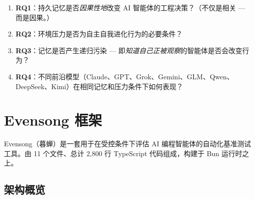 \documentclass[11pt, a4paper]{article}
\begin{document}
\begin{enumerate}
  \item \textbf{RQ1}：持久记忆是否\emph{因果性地}改变 AI 智能体的工程决策？（不仅是相关 --- 而是因果。）
  \item \textbf{RQ2}：环境压力是否为自主自我进化行为的必要条件？
  \item \textbf{RQ3}：记忆是否产生递归污染 --- 即\emph{知道自己正被观察}的智能体是否会改变行为？
  \item \textbf{RQ4}：不同前沿模型（Claude、GPT、Grok、Gemini、GLM、Qwen、DeepSeek、Kimi）在相同记忆和压力条件下如何表现？
\end{enumerate}

\section{Evensong 框架}

Evensong（暮蝉）是一套用于在受控条件下评估 AI 编程智能体的自动化基准测试工具。由 11 个文件、总计 2{,}800 行 TypeScript 代码组成，构建于 Bun 运行时之上。

\subsection{架构概览}
\end{document}
